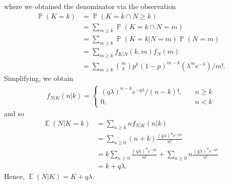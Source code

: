 \documentclass[12pt]{amsbook}
\DeclareMathOperator{\ex}{\mathbb{E}}
\DeclareMathOperator{\prob}{\mathbb{P}}
\theoremstyle{plain}
\theoremstyle{definition}
\theoremstyle{remark}
\numberwithin{equation}{section}  %
\numberwithin{equation}{section}  %
\begin{document}
	where we obtained the denominator via the observation
	\begin{align*}
		\prob(K = k) & = \prob(K = k \cap N \ge k) 
		\\
		& = \sum_{m \ge k} \prob(K =
		k \cap N = m) 
		\\
		& = \sum_{m \ge k} \prob(K = k | N = m) \prob(N = m)
		\\
		& = \sum_{m \ge k} f_{K|N}(k, m) f_N(m)
		\\
		& = \sum_{m \ge k}
		\binom{m}{k} p^k {(1 - p)}^{m-k} (\lambda^m e^{-\lambda})/m!.
	\end{align*}
	Simplifying, we obtain
	\begin{align*}
		f_{N|K}(n|k) = 
		\begin{cases}
			{(q\lambda)}^{n-k} e^{-q\lambda}/(n-k)!, \quad & n \ge k
			\\
			0, \quad & n<k
		\end{cases}
	\end{align*}
	and so 
	\begin{align*}
		\ex(N | K = k) & = \sum_{n \ge k} n f_{N|K}(n | k)
		\\
		& = \sum_{n \ge 0} (n + k) \frac{{(q \lambda)}^n e^{-q\lambda}}{n!}
		\\
		& = k \sum_{n \ge 0} \frac{{(q \lambda)}^n e^{-q\lambda}}{n!} + \sum_{n \ge 
		0}
		n \frac{{(q\lambda)}^n e^{-q\lambda}}{n!} 
		\\
		& = k + q\lambda.
	\end{align*}
	Hence, $\ex(N|K) = K + q \lambda$.
\end{document}
